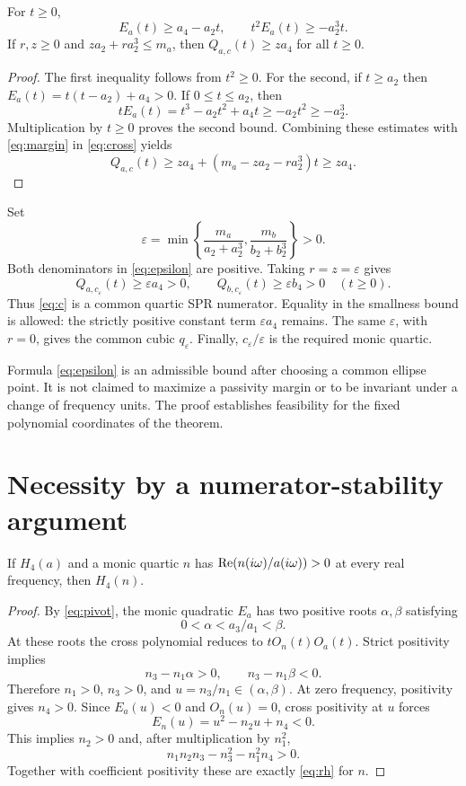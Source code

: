 \documentclass[11pt]{article}
\begin{document}
\begin{lemma}\label{lem:perturb}
For $t\ge0$,
\begin{equation}\label{eq:bounds}
 E_a(t)\ge a_4-a_2t,\qquad t^2E_a(t)\ge-a_2^3t.
\end{equation}
If $r,z\ge0$ and $za_2+ra_2^3\le m_a$, then $Q_{a,c}(t)\ge za_4$ for all $t\ge0$.
\end{lemma}
\begin{proof}
The first inequality follows from $t^2\ge0$. For the second, if $t\ge a_2$ then $E_a(t)=t(t-a_2)+a_4>0$. If $0\le t\le a_2$, then
\[
 tE_a(t)=t^3-a_2t^2+a_4t\ge-a_2t^2\ge-a_2^3.
\]
Multiplication by $t\ge0$ proves the second bound. Combining these estimates with \eqref{eq:margin} in \eqref{eq:cross} yields
\[
 Q_{a,c}(t)\ge za_4+(m_a-za_2-ra_2^3)t\ge za_4.
\]
\end{proof}

Set
\begin{equation}\label{eq:epsilon}
 \varepsilon=
 \min\left\{\frac{m_a}{a_2+a_2^3},\frac{m_b}{b_2+b_2^3}\right\}>0.
\end{equation}
Both denominators in \eqref{eq:epsilon} are positive. Taking $r=z=\varepsilon$ gives
\[
 Q_{a,c_\varepsilon}(t)\ge\varepsilon a_4>0,\qquad
 Q_{b,c_\varepsilon}(t)\ge\varepsilon b_4>0\quad(t\ge0).
\]
Thus \eqref{eq:c} is a common quartic SPR numerator. Equality in the smallness bound is allowed: the strictly positive constant term $\varepsilon a_4$ remains. The same $\varepsilon$, with $r=0$, gives the common cubic $q_\varepsilon$. Finally, $c_\varepsilon/\varepsilon$ is the required monic quartic.

\begin{remark}
Formula \eqref{eq:epsilon} is an admissible bound after choosing a common ellipse point. It is not claimed to maximize a passivity margin or to be invariant under a change of frequency units. The proof establishes feasibility for the fixed polynomial coordinates of the theorem.
\end{remark}

\section{Necessity by a numerator-stability argument}
\begin{lemma}\label{lem:numstable}
If $H_4(a)$ and a monic quartic $n$ has $\operatorname{Re}(n(i\omega)/a(i\omega))>0$ at every real frequency, then $H_4(n)$.
\end{lemma}
\begin{proof}
By \eqref{eq:pivot}, the monic quadratic $E_a$ has two positive roots $\alpha,\beta$ satisfying
\[
 0<\alpha<a_3/a_1<\beta.
\]
At these roots the cross polynomial reduces to $tO_n(t)O_a(t)$. Strict positivity implies
\[
 n_3-n_1\alpha>0,\qquad n_3-n_1\beta<0.
\]
Therefore $n_1>0$, $n_3>0$, and $u=n_3/n_1\in(\alpha,\beta)$. At zero frequency, positivity gives $n_4>0$. Since $E_a(u)<0$ and $O_n(u)=0$, cross positivity at $u$ forces
\[
 E_n(u)=u^2-n_2u+n_4<0.
\]
This implies $n_2>0$ and, after multiplication by $n_1^2$,
\[
 n_1n_2n_3-n_3^2-n_1^2n_4>0.
\]
Together with coefficient positivity these are exactly \eqref{eq:rh} for $n$.
\end{proof}
\end{document}
